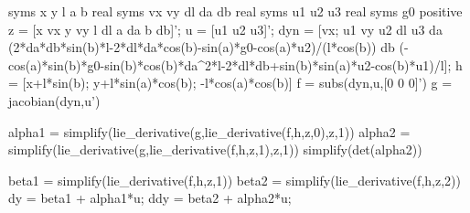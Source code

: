 \begin{MATLAB}
syms x y l a b real %
syms vx vy dl da db real %
syms u1 u2 u3 real %
syms g0 positive %
z = [x vx y vy l dl a da b db]';
u = [u1 u2 u3]';
dyn = [vx;
       u1
       vy
       u2
       dl
       u3
       da
       (2*da*db*sin(b)*l-2*dl*da*cos(b)-sin(a)*g0-cos(a)*u2)/(l*cos(b))
       db
       (-cos(a)*sin(b)*g0-sin(b)*cos(b)*da^2*l-2*dl*db+sin(b)*sin(a)*u2-cos(b)*u1)/l];
h = [x+l*sin(b);
     y+l*sin(a)*cos(b);
     -l*cos(a)*cos(b)]
f = subs(dyn,u,[0 0 0]')
g = jacobian(dyn,u')
% 
% 
% 
% 

alpha1 = simplify(lie_derivative(g,lie_derivative(f,h,z,0),z,1))
alpha2 = simplify(lie_derivative(g,lie_derivative(f,h,z,1),z,1))
simplify(det(alpha2))
% 
% 

beta1 = simplify(lie_derivative(f,h,z,1))
beta2 = simplify(lie_derivative(f,h,z,2))
dy = beta1 + alpha1*u;
ddy = beta2 + alpha2*u;
% 
% 
% 
% 
% 
% 
% 
% 


\end{MATLAB}
